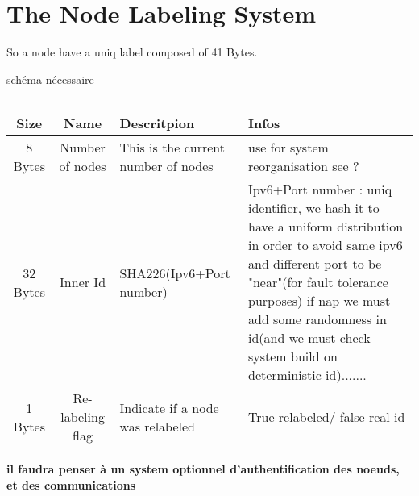 \section{The Node Labeling System}
So a node have a uniq label composed of 41 Bytes.

schéma nécessaire
\begin{table}[h]
  \centering
  \begin{tabular}{|c|c|p{}|p{}|}
  \hline
  Size & Name & Descritpion & Infos \\
  \hline
  8 Bytes & Number of nodes & This is the current number of nodes & use for system reorganisation see ?\\
  32 Bytes & Inner Id & SHA226(Ipv6+Port number) & 
    Ipv6+Port number : uniq identifier,
    we hash it to have a uniform distribution in order to avoid same ipv6 and 
    different port to be "near"(for fault tolerance purposes)
    if nap we must add some randomness in id(and we must check system build on deterministic id).......\\
  1 Bytes & Re-labeling flag & Indicate if a node was relabeled & True relabeled/ false real id\\
  \hline
  \end{tabular}
  \caption{}
\end{table}


\textbf{il faudra penser à un system optionnel d'authentification des noeuds, 
et des communications}